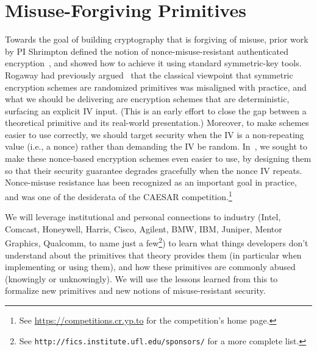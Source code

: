 \section{Misuse-Forgiving Primitives}
Towards the goal of building cryptography that is forgiving of misuse, prior
work by PI Shrimpton defined the notion of nonce-misuse-resistant authenticated
encryption~\cite{RS06}, and showed how to achieve it using standard
symmetric-key tools.  Rogaway had previously argued~\cite{Rog04} that the
classical viewpoint that symmetric encryption schemes are randomized primitives
was misaligned with practice, and what we should be delivering are encryption
schemes that are deterministic, surfacing an explicit IV input. (This is an
early effort to close the gap between a theoretical primitive and its real-world
presentation.)  Moreover, to make schemes easier to use correctly, we should
target security when the IV is a non-repeating value (i.e., a nonce) rather than
demanding the IV be random.  In~\cite{RS06}, we sought to make these nonce-based
encryption schemes even easier to use, by designing them so that their security
guarantee degrades gracefully when the nonce IV repeats.  Nonce-misuse
resistance has been recognized as an important goal in practice, and was one of the
desiderata of the CAESAR competition.\footnote{See
\url{https://competitions.cr.yp.to} for the competition's home page.}
%

\begin{task}
We will leverage institutional and personal connections to industry (Intel,
Comcast, Honeywell, Harris, Cisco, Agilent, BMW, IBM, Juniper, Mentor
Graphics, Qualcomm, to name just a few\footnote{See
  \texttt{http://fics.institute.ufl.edu/sponsors/} for a more complete
  list.}) to learn what things developers don't understand about the
primitives that theory provides them (in particular when implementing
or using them), and how these primitives are commonly abused (knowingly or
unknowingly).  We will use the lessons learned from this to formalize
new primitives and new notions of misuse-resistant security.
\end{task}

